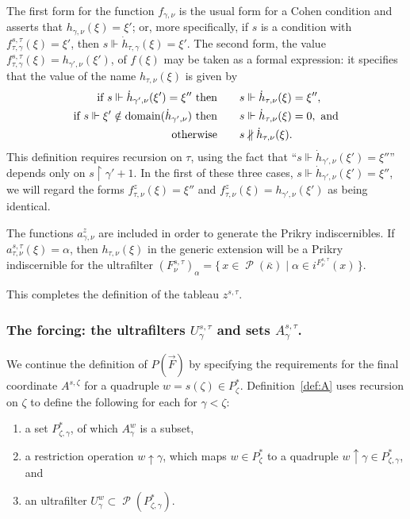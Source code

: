 \documentclass[
twoside,
]{article}
\theoremstyle{definition}
\theoremstyle{remark}
\newcommand{\forceKappa}{\bar\kappa} %
\newcommand{\scutdown}{{\uparrow}}
\DeclareMathOperator{\ps}{\mathcal{P}}
\newcommand{\forces}{\Vdash}
\newcommand{\ndecides}{\nparallel}
\newcommand{\set}[1]{\{\,#1\,\}}
\newcommand{\restrict}{{\upharpoonright}}
\DeclareMathOperator{\domain}{domain}
\begin{document}
The first form for the function $f_{\gamma,\nu}$ is the usual form for
a Cohen condition and asserts that 
$h_{\gamma,\nu}(\xi)=\xi'$;  or, more specifically,  if $s$ is a
condition with  $f^{s,\tau}_{\tau,\gamma}(\xi)=\xi'$,
then $s\forces \dot h_{\tau,\gamma}(\xi)=\xi'$.    The second form, 
the value $f^{s,\tau}_{\tau,\gamma}(\xi)=h_{\gamma',\nu}(\xi')$,  
of $f(\xi)$  may be taken as a formal expression: it specifies that  the value of 
the name $h_{\tau,\nu}(\xi)$ is given by
\begin{align}
  \text{if $s\forces \dot h_{\gamma',\nu}(\xi')=\xi''$ then}\quad&\quad s\forces\dot
  h_{\tau,\nu}(\xi)=\xi'',\label{eq:fpeculiareval}\\
  \text{if $s\forces\xi'\notin \domain(\dot h_{\gamma',\nu})$ then}\quad&\quad
  s\forces \dot h_{\tau,\nu}(\xi)=0, \text{ and}\notag\\
  \text{otherwise}
 \quad&\quad  s\ndecides\dot h_{\tau,\nu}(\xi).\notag
\end{align}
This definition requires recursion on $\tau$, using the fact that  ``$s\forces
\dot h_{\gamma',\nu}(\xi')=\xi''$'' depends only on $s\restrict\gamma'+1$.
In the first of these three cases, $s\forces \dot h_{\gamma',\nu}(\xi')=\xi''$, we will
regard the forms $f_{\tau,\nu}^{z}(\xi)=\xi''$ and
$f_{\tau,\nu}^{z}(\xi)=h_{\gamma',\nu}(\xi')$ as being identical.
\medskip{}

The functions $a^{z}_{\gamma,\nu}$ are included in order to generate the Prikry
indiscernibles. If $a^{s,\tau}_{\tau,\nu}(\xi)=\alpha$, then
$h_{\tau,\nu}(\xi)$ in the generic extension will 
be a Prikry indiscernible for the ultrafilter
$(F^{s,\tau}_{\nu})_{\alpha}=\set{x\in \ps(\forceKappa) \mid \alpha\in
  i^{F^{s,\tau}_{\nu}}(x)}$.

This completes the definition of the tableau $z^{s,\tau}$.   

\subsubsection{The forcing: the ultrafilters $U^{s,\tau}_{\gamma}$ and
  sets $A^{s,\tau}_{\gamma}$.}
We continue the definition of $P(\vec F)$ by specifying the
requirements for the final coordinate $A^{s,\zeta}$ for a quadruple
$w=s(\zeta)\in P^*_{\zeta}$.  Definition~\ref{def:A}  uses recursion on 
$\zeta$ to define the following for each    
for $\gamma<\zeta$: 
\begin{enumerate}
\item 
 a set $P^{*}_{\zeta,\gamma}$,  of which $A^{w}_{\gamma}$
is  a subset,
\item    a restriction operation
$w\scutdown\gamma$, which maps $w\in P^*_{\zeta}$ to a quadruple 
$w\scutdown\gamma\in P^{*}_{\zeta,\gamma}$, and 
\item an ultrafilter
$U^{w}_{\gamma}\subset\ps(P^{*}_{\zeta,\gamma})$.
\end{enumerate}
\end{document}
